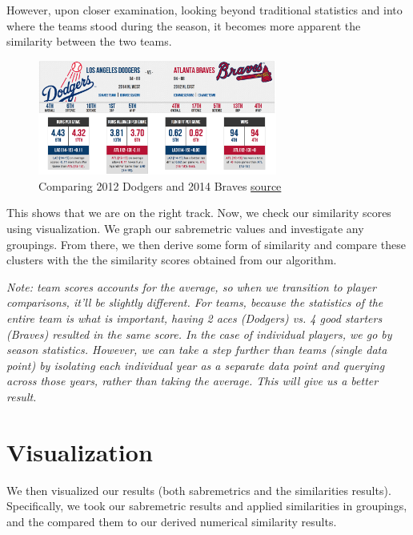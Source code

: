 \documentclass[12pt]{article}
\numberwithin{equation}{subsection}
\begin{document}
However, upon closer examination, looking beyond traditional statistics and into where the teams stood during the season, it becomes more apparent the similarity between the two teams.

\begin{figure}[H]
	\centering
	\includegraphics[width=0.7\textwidth]{dodgersbraves}
    \caption{Comparing 2012 Dodgers and 2014 Braves \href{http://www.sportingcharts.com/mlb/teams/matchup/243-los-angeles-dodgers-2014-vs-239-atlanta-braves-2012/}{source}}
\end{figure}

This shows that we are on the right track. Now, we check our similarity scores using visualization. We graph our sabremetric values and investigate any groupings. From there, we then derive some form of similarity and compare these clusters with the the similarity scores obtained from our algorithm.

\textit{Note: team scores accounts for the average, so when we transition to player comparisons, it'll be slightly different. For teams, because the statistics of the entire team is what is important, having 2 aces (Dodgers) vs. 4 good starters (Braves) resulted in the same score. In the case of individual players, we go by season statistics. However, we can take a step further than teams (single data point) by isolating each individual year as a separate data point and querying across those years, rather than taking the average. This will give us a better result.}

\section{Visualization} %
We then visualized our results (both sabremetrics and the similarities results). Specifically, we took our sabremetric results and applied similarities in groupings, and the compared them to our derived numerical similarity results.
\end{document}
